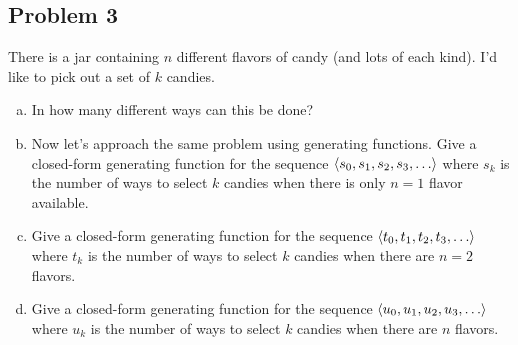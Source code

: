 \documentclass[12pt]{article}
\begin{document}

\newpage

\subsection*{Problem 3}

There is a jar containing $n$ different flavors of candy (and lots of each kind).  I'd like to
pick out a set of $k$ candies.

\begin{enumerate}[(a)]

\item In how many different ways can this be done?


\item Now let's approach the same problem using generating functions.
Give a closed-form generating function for the sequence $\left\langle s_0,
s_1, s_2, s_3, \ldots\right\rangle$ where $s_k$ is the number of ways to select
$k$ candies when there is only $n = 1$ flavor available.

\solution[\vspace{1.25in}]{
\[
1 + x + x^2 + x^3 + \ldots = \frac{1}{1-x}
\]
}

\item Give a closed-form generating function for the sequence
$\left\langle t_0, t_1, t_2, t_3, \ldots\right\rangle$ where $t_k$ is the number of ways
to select $k$ candies when there are $n = 2$ flavors.

\solution[\vspace{1.25in}]{
\[
(1 + x + x^2 + x^3 + \ldots)^2 = \frac{1}{(1-x)^2}
\]
}

\item Give a closed-form generating function for the sequence
$\left\langle u_0, u_1, u_2, u_3, \ldots\right\rangle$ where $u_k$ is the number of ways
to select $k$ candies when there are $n$ flavors.

\solution[\vspace{1.25in}]{
\[
\frac{1}{(1-x)^n}
\]
}

\end{enumerate}

\end{document}
